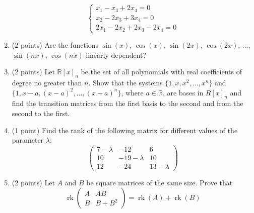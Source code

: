 \documentclass{article}
\begin{document}
\begin{enumerate}
\[\begin{cases}x_1 - x_3 + 2 x_4 = 0 \\x_2 - 2 x_3 + 3 x_4 = 0 \\2 x_1 - 2 x_2 + 2 x_3 - 2 x_4 = 0\end{cases}\]

\item (2 points) Are the functions $\sin(x)$, $\cos(x)$, $\sin(2x)$, $\cos(2x)$, ..., $\sin(nx)$, $\cos(nx)$ linearly dependent?

\item (2 points) Let $\mathbb{R}[x]_n$ be the set of all polynomials with real coefficients 
of degree no greater than $n$. 
Show that the systems $\{1, x, x^2, \dots, x^n\}$ and $\{1, x - a, (x - a)^2, \dots, (x - a)^n\}$, 
where $a \in \mathbb{R}$, are bases in $R[x]_n$ and 
find the transition matrices from the first basis to the second and from the second to the first.

\item (1 point) Find the rank of the following matrix for different values of 
the parameter $\lambda$:
\[
\begin{pmatrix}
7 - \lambda & -12 & 6 \\
10 & -19 - \lambda & 10 \\
12 & -24 & 13 - \lambda
\end{pmatrix}
\]

\item (2 points) Let $A$ and $B$ be square matrices of the same size. 
Prove that
\[\operatorname{rk}\begin{pmatrix}A & AB \\B & B + B^2\end{pmatrix} = 
\operatorname{rk}(A) + \operatorname{rk}(B)\]
\end{enumerate}
\end{document}
